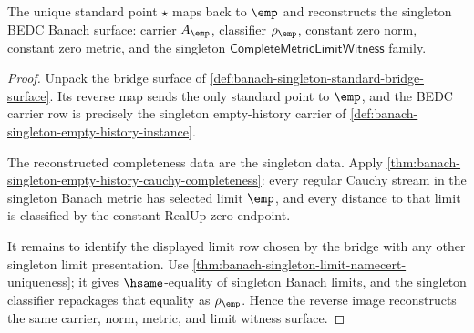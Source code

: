 \begin{theorem}
\label{thm:banach-singleton-standard-bridge-completeness}
The unique standard point $\star$ maps back to $\emp$ and reconstructs the
singleton BEDC Banach surface: carrier $A_{\emp}$, classifier $\rho_{\emp}$,
constant zero norm, constant zero metric, and the singleton
$\mathsf{CompleteMetricLimitWitness}$ family.
\end{theorem}
\begin{proof}
Unpack the bridge surface of
\autoref{def:banach-singleton-standard-bridge-surface}. Its reverse map sends
the only standard point to $\emp$, and the BEDC carrier row is precisely the
singleton empty-history carrier of
\autoref{def:banach-singleton-empty-history-instance}.

The reconstructed completeness data are the singleton data. Apply
\autoref{thm:banach-singleton-empty-history-cauchy-completeness}: every
regular Cauchy stream in the singleton Banach metric has selected limit
$\emp$, and every distance to that limit is classified by the constant RealUp
zero endpoint.

It remains to identify the displayed limit row chosen by the bridge with any
other singleton limit presentation. Use
\autoref{thm:banach-singleton-limit-namecert-uniqueness}; it gives
$\hsame$-equality of singleton Banach limits, and the singleton classifier
repackages that equality as $\rho_{\emp}$. Hence the reverse image reconstructs
the same carrier, norm, metric, and limit witness surface.
\end{proof}

